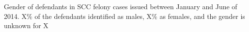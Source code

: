 Gender of defendants in SCC felony cases issued between January and June of 2014. X\% of the defendants identified as males, X\% as females, and the gender is unknown for X%
\label{fig:GenderBreakdown}